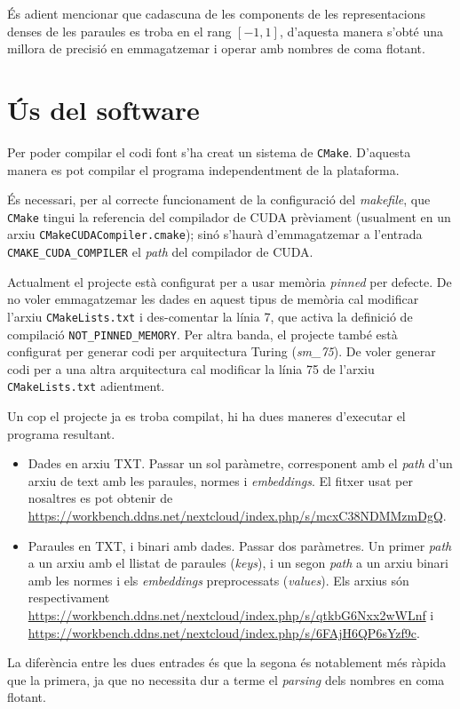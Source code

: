 \documentclass[catalan,10pt,a4paper]{article}
\begin{document}
És adient mencionar que cadascuna de les components de les representacions denses de les paraules es troba en el rang $[-1,1]$, d'aquesta manera s'obté una millora de precisió en emmagatzemar i operar amb nombres de coma flotant.

\section*{Ús del software}
Per poder compilar el codi font s'ha creat un sistema de \verb|CMake|. D'aquesta manera es pot compilar el programa independentment de la plataforma.

És necessari, per al correcte funcionament de la configuració del \textit{makefile}, que \verb|CMake| tingui la referencia del compilador de CUDA prèviament (usualment en un arxiu \verb|CMakeCUDACompiler.cmake|); sinó s'haurà d'emmagatzemar a l'entrada \verb|CMAKE_CUDA_COMPILER| el \textit{path} del compilador de CUDA.

Actualment el projecte està configurat per a usar memòria \textit{pinned} per defecte. De no voler emmagatzemar les dades en aquest tipus de memòria cal modificar l'arxiu \verb|CMakeLists.txt| i des-comentar la línia 7, que activa la definició de compilació \verb|NOT_PINNED_MEMORY|. \newline
Per altra banda, el projecte també està configurat per generar codi per arquitectura Turing (\textit{sm\_75}). De voler generar codi per a una altra arquitectura cal modificar la línia 75 de l'arxiu \verb|CMakeLists.txt| adientment.

Un cop el projecte ja es troba compilat, hi ha dues maneres d'executar el programa resultant.
\begin{itemize} %
	\item Dades en arxiu TXT. Passar un sol paràmetre, corresponent amb el \textit{path} d'un arxiu de text amb les paraules, normes i \textit{embeddings}. El fitxer usat per nosaltres es pot obtenir de \url{https://workbench.ddns.net/nextcloud/index.php/s/mcxC38NDMMzmDgQ}.
	\item Paraules en TXT, i binari amb dades. Passar dos paràmetres. Un primer \textit{path} a un arxiu amb el llistat de paraules (\textit{keys}), i un segon \textit{path} a un arxiu binari amb les normes i els \textit{embeddings} preprocessats (\textit{values}). Els arxius són respectivament \url{https://workbench.ddns.net/nextcloud/index.php/s/qtkbG6Nxx2wWLnf} i \url{https://workbench.ddns.net/nextcloud/index.php/s/6FAjH6QP6sYzf9c}.
\end{itemize}
La diferència entre les dues entrades és que la segona és notablement més ràpida que la primera, ja que no necessita dur a terme el \textit{parsing} dels nombres en coma flotant.
\end{document}
